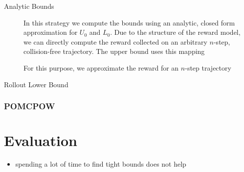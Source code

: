 \begin{description}
  \item[Analytic Bounds] In this strategy we compute the bounds using an
  analytic, closed form approximation
  for $U_0$ and $L_0$. Due to the structure of the reward model, we can directly
  compute the reward collected on an arbitrary $n$-step, collision-free
  trajectory. The upper bound uses this mapping 

  For this purpose, we approximate the reward for an
  $n$-step trajectory 
  \item[Rollout Lower Bound]
\end{description}


\subsubsection{POMCPOW}\label{sec:lp-planners-pomcpow}

\section{Evaluation}\label{sec:lp-evaluation}

\begin{itemize}
  \item spending a lot of time to find tight bounds does not help
\end{itemize}


\begin{figure}[ht]
\end{figure}
